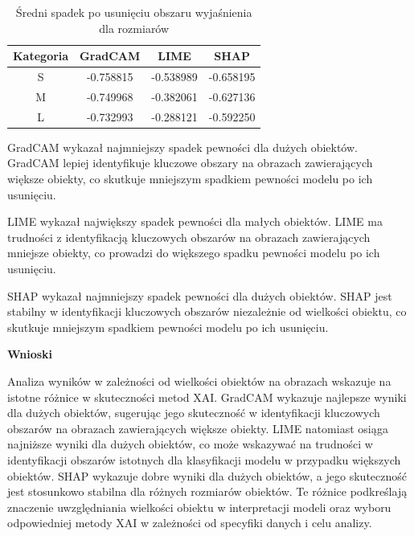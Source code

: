 \begin{table}
	\centering
	\begin{tabular}{|c|c|c|c|}
		\hline
		\textbf{Kategoria} & \textbf{GradCAM} & \textbf{LIME} & \textbf{SHAP} \\
		\hline
		S                  & -0.758815        & -0.538989     & -0.658195     \\
		\hline
		M                  & -0.749968        & -0.382061     & -0.627136     \\
		\hline
		L                  & -0.732993        & -0.288121     & -0.592250     \\
		\hline
	\end{tabular}
	\caption{Średni spadek po usunięciu obszaru wyjaśnienia dla rozmiarów}
	\label{tab:size_confidence_no_exp}
\end{table}

GradCAM wykazał najmniejszy spadek pewności dla dużych obiektów.
GradCAM lepiej identyfikuje kluczowe obszary na obrazach zawierających większe obiekty, co skutkuje mniejszym spadkiem pewności modelu po ich usunięciu.

LIME wykazał największy spadek pewności dla małych obiektów.
LIME ma trudności z identyfikacją kluczowych obszarów na obrazach zawierających mniejsze obiekty, co prowadzi do większego spadku pewności modelu po ich usunięciu.

SHAP wykazał najmniejszy spadek pewności dla dużych obiektów.
SHAP jest stabilny w identyfikacji kluczowych obszarów niezależnie od wielkości obiektu, co skutkuje mniejszym spadkiem pewności modelu po ich usunięciu.

\textbf{Wnioski}

Analiza wyników w zależności od wielkości obiektów na obrazach wskazuje na istotne różnice w skuteczności metod XAI.
GradCAM wykazuje najlepsze wyniki dla dużych obiektów, sugerując jego skuteczność w identyfikacji kluczowych obszarów na obrazach zawierających większe obiekty.
LIME natomiast osiąga najniższe wyniki dla dużych obiektów, co może wskazywać na trudności w identyfikacji obszarów istotnych dla klasyfikacji modelu w przypadku większych obiektów.
SHAP wykazuje dobre wyniki dla dużych obiektów, a jego skuteczność jest stosunkowo stabilna dla różnych rozmiarów obiektów.
Te różnice podkreślają znaczenie uwzględniania wielkości obiektu w interpretacji modeli oraz wyboru odpowiedniej metody XAI w zależności od specyfiki danych i celu analizy.
